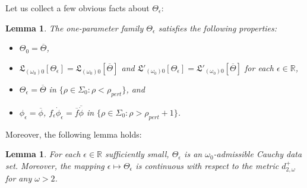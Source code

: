 \documentclass[10pt, reqno]{amsart}
\newtheorem{lemma}[theorem]{Lemma}
\theoremstyle{definition}
\theoremstyle{remark}
\theoremstyle{conjecture}
\numberwithin{equation}{section}
\newcommand{\set}[1]{\{#1\}}
\newcommand{\0}{\emptyset}
\newcommand{\eps}{\epsilon}
\newcommand{\Sgm}{\Sigma}
\newcommand{\Tht}{\Theta}
\newcommand{\omg}{\omega}
\newcommand{\bbR}{\mathbb R}
\newcommand{\phibg}{\overline{\phi}}				%
\newcommand{\fbg}{\overline{f}}
\begin{document}
Let us collect a few obvious facts about $\Tht_\eps$:
\begin{lemma}\label{lem:Thtep.facts}
The one-parameter family $\Tht_{\eps}$ satisfies the following properties:
\begin{itemize}
\item $\Tht_{0} = \overline{\Tht}$, 
\item $\mathfrak{L}_{(\omg_{0}) 0}[\Tht_{\eps}] = \mathfrak{L}_{(\omg_{0}) 0}[\overline{\Tht}]$ and $\mathfrak{L}'_{(\omg_{0}) 0}[\Tht_{\eps}] = \mathfrak{L}'_{(\omg_{0}) 0}[\overline{\Tht}]$
for each $\eps \in \bbR$, 
\item $\Tht_{\eps} = \overline{\Tht}$ in $\set{\rho \in \Sgm_{0} : \rho < \rho_{pert}}$, and
\item $\phi_{\eps}=\phibg$, $f_{\eps}\dot{\phi}_{\eps}=\fbg \overline{\dot{\phi}}$ in $\set{\rho \in \Sgm_{0} : \rho > \rho_{pert}+1}$.
\end{itemize}
\end{lemma}
Moreover, the following lemma holds:
\begin{lemma} \label{lem:inst-cont}
For each $\eps \in \bbR$ sufficiently small, $\Tht_{\eps}$ is an $\omg_{0}$-admissible Cauchy data set. Moreover, the mapping $\eps \mapsto \Tht_{\eps}$ is continuous with respect to the metric $d^{+}_{2, \omg}$ for any $\omg > 2$.
\end{lemma}
\end{document}
